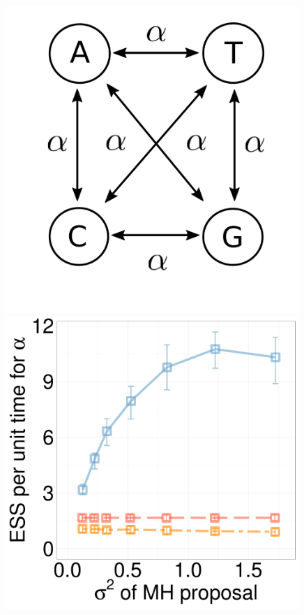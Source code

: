    \begin{figure}%
  \begin{minipage}[!hp]{0.24\linewidth}
	\centering
    \includegraphics[width=0.99\textwidth, angle=0]{figs/jc_model.pdf} 
	\end{minipage}
	  \begin{minipage}[!hp]{0.24\linewidth}
	\centering
    \includegraphics[width=0.99\textwidth, angle=0]{figs/new_experiment_figs/jc_alpha_k2.pdf}

\end{minipage}
\end{figure}
